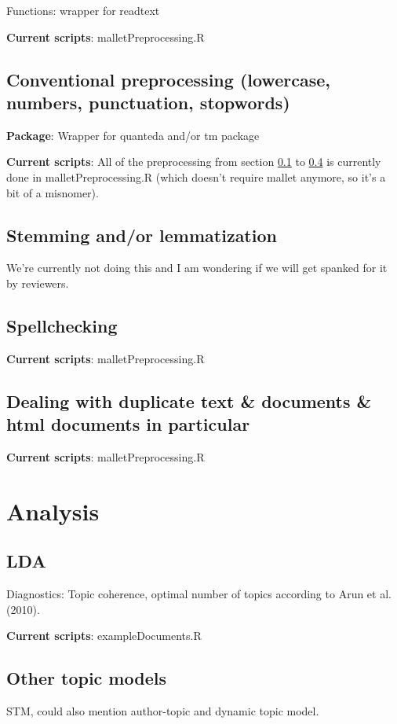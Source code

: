 \documentclass[11pt]{article}
\begin{document}
Functions: wrapper for readtext

\textbf{Current scripts}: malletPreprocessing.R

\subsection{Conventional preprocessing (lowercase, numbers, punctuation, stopwords)} \label{preprocessing_conventional}

\textbf{Package}: Wrapper for quanteda and/or tm package

\textbf{Current scripts}: All of the preprocessing from section \ref{preprocessing_conventional} to \ref{preprocessing_duplicates} is currently done in malletPreprocessing.R (which doesn't require mallet anymore, so it's a bit of a misnomer).

\subsection{Stemming and/or lemmatization}
We're currently not doing this and I am wondering if we will get spanked for it by reviewers.

\subsection{Spellchecking}

\textbf{Current scripts}: malletPreprocessing.R

\subsection{Dealing with duplicate text \& documents \& html documents in particular} \label{preprocessing_duplicates}

\textbf{Current scripts}: malletPreprocessing.R

\section{Analysis}
\subsection{LDA}

Diagnostics: Topic coherence, optimal number of topics according to Arun et al. (2010).

\textbf{Current scripts}: exampleDocuments.R

\subsection{Other topic models}
STM, could also mention author-topic and dynamic topic model.
\end{document}
